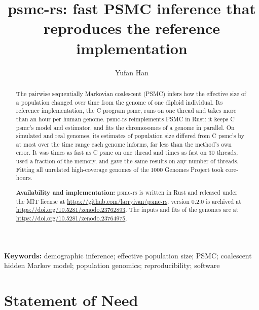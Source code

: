 \documentclass[a4paper,num-refs,gigabyte]{oup-contemporary}%
\date{}
\title{psmc-rs: fast PSMC inference that reproduces the reference implementation}
\author[1,\authfn{1}]{Yufan Han}
\affil[1]{School of Life Sciences, Fudan University, Shanghai, China}
\def\gigabytepreview{}%
\newenvironment{frontmatter}{}{}
\newenvironment{keywords}{\par\medskip\noindent\textbf{Keywords:} }{\par\medskip}
\begin{document}
\begin{frontmatter}
\maketitle
\ifdefined\gigabytepreview{}\par\fi

\begin{abstract}
The pairwise sequentially Markovian coalescent (PSMC) infers how the effective size of a population changed over time from the genome of one diploid individual. Its reference implementation, the C program psmc, runs on one thread and takes more than an hour per human genome. psmc-rs reimplements PSMC in Rust: it keeps C psmc's model and estimator, and fits the chromosomes of a genome in parallel. On \EoneGenomes{} simulated and \RealGenomes{} real genomes, its estimates of population size differed from C psmc's by at most \AgreeMaxPct{} over the time range each genome informs, far less than the method's own error. It was \EthreeSpeedOne{} times as fast as C psmc on one thread and \EthreeSpeedThirty{} times as fast on 30 threads, used a fraction of the memory, and gave the same results on any number of threads. Fitting all \EsevenGenomes{} unrelated high-coverage genomes of the 1000 Genomes Project took \EsevenRsCoreHours{} core-hours.

\textbf{Availability and implementation:} psmc-rs is written in Rust and released under the MIT license at \url{https://github.com/larryivan/psmc-rs}; version 0.2.0 is archived at \url{https://doi.org/10.5281/zenodo.23762893}. The inputs and fits of the \EsevenGenomes{} genomes are at \url{https://doi.org/10.5281/zenodo.23764975}.
\end{abstract}

\begin{keywords}
demographic inference; effective population size; PSMC; coalescent hidden Markov model; population genomics; reproducibility; software
\end{keywords}
\end{frontmatter}

\section{Statement of Need}
\label{sec:background}
\end{document}
